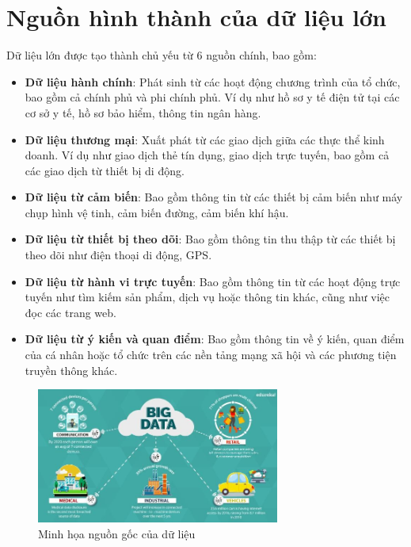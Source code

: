\section{Nguồn hình thành của dữ liệu lớn}
Dữ liệu lớn được tạo thành chủ yếu từ 6 nguồn chính, bao gồm:
\begin{itemize}
    \item \textbf{Dữ liệu hành chính}: Phát sinh từ các hoạt động chương trình của tổ chức,
          bao gồm cả chính phủ và phi chính phủ. Ví dụ như hồ sơ y tế điện tử tại các
          cơ sở y tế, hồ sơ bảo hiểm, thông tin ngân hàng.
    \item \textbf{Dữ liệu thương mại}: Xuất phát từ các giao dịch giữa các thực thể kinh
          doanh. Ví dụ như giao dịch thẻ tín dụng, giao dịch trực tuyến, bao gồm cả các
          giao dịch từ thiết bị di động.
    \item \textbf{Dữ liệu từ cảm biến}: Bao gồm thông tin từ các thiết bị cảm biến như
          máy chụp hình vệ tinh, cảm biến đường, cảm biến khí hậu.
    \item \textbf{Dữ liệu từ thiết bị theo dõi}: Bao gồm thông tin thu thập từ các thiết bị
          theo dõi như điện thoại di động, GPS.
    \item \textbf{Dữ liệu từ hành vi trực tuyến}: Bao gồm thông tin từ các hoạt động trực
          tuyến như tìm kiếm sản phẩm, dịch vụ hoặc thông tin khác, cũng như việc đọc
          các trang web.
    \item \textbf{Dữ liệu từ ý kiến và quan điểm}: Bao gồm thông tin về ý kiến, quan điểm
          của cá nhân hoặc tổ chức trên các nền tảng mạng xã hội và các phương tiện
          truyền thông khác.
\end{itemize}
\begin{figure}[ht]
    \centering
    \includegraphics[width=8cm]{images/BigData.jpg}
    \caption{Minh họa nguồn gốc của dữ liệu}
\end{figure}

